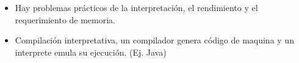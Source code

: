 \begin{itemize}
\item Hay problemas prácticos de la interpretación, el rendimiento y el requerimiento de memoria.
\item Compilación interpretativa, un compilador genera código de maquina y un interprete emula su ejecución. (Ej. Java)
\end{itemize}


%




